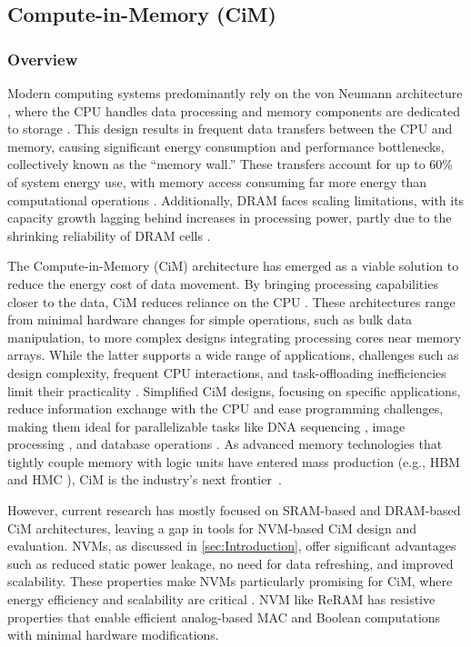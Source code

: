 \subsection{Compute-in-Memory (CiM)} \label{sec:nvm-cim}


\subsubsection{Overview}

Modern computing systems predominantly rely on the von Neumann architecture \cite{kit1}, where the CPU handles data processing and memory components are dedicated to storage \cite{kit2}. This design results in frequent data transfers between the CPU and memory, causing significant energy consumption and performance bottlenecks, collectively known as the ``memory wall.'' These transfers account for up to 60\% of system energy use, with memory access consuming far more energy than computational operations \cite{kit3,kit4,kit5}. Additionally, DRAM faces scaling limitations, with its capacity growth lagging behind increases in processing power, partly due to the shrinking reliability of DRAM cells \cite{kit/dramScale1,kit/dramScale2,kit/dramScale3}.

The Compute-in-Memory (CiM) architecture has emerged as a viable solution to reduce the energy cost of data movement. By bringing processing capabilities closer to the data, CiM reduces reliance on the CPU \cite{kit/ext1,kit/ext2,kit/ext3}. These architectures range from minimal hardware changes for simple operations, such as bulk data manipulation, to more complex designs integrating processing cores near memory arrays. While the latter supports a wide range of applications, challenges such as design complexity, frequent CPU interactions, and task-offloading inefficiencies limit their practicality \cite{kit/ext2}. Simplified CiM designs, focusing on specific applications, reduce information exchange with the CPU and ease programming challenges, making them ideal for parallelizable tasks like DNA sequencing \cite{kit/dna1,kit/dna2, hameed_tetc21}, image processing \cite{kit/img1,kit/img2}, and database operations \cite{kit/db1,kit/db2}.
As advanced memory technologies that tightly couple memory with logic units have entered mass production (e.g., HBM \cite{kit/hbm} and HMC \cite{kit/hmc}), CiM is the industry's next frontier~\cite{khan_cimlandscape_2024}.

However, current research has mostly focused on SRAM-based and DRAM-based CiM architectures, leaving a gap in tools for NVM-based CiM design and evaluation. NVMs, as discussed in \cref{sec:Introduction}, offer significant advantages such as reduced static power leakage, no need for data refreshing, and improved scalability. These properties make NVMs particularly promising for CiM, where energy efficiency and scalability are critical \cite{kit/ext1,kit/ext4}. NVM like ReRAM has resistive properties that enable efficient analog-based MAC and Boolean computations with minimal hardware modifications.



